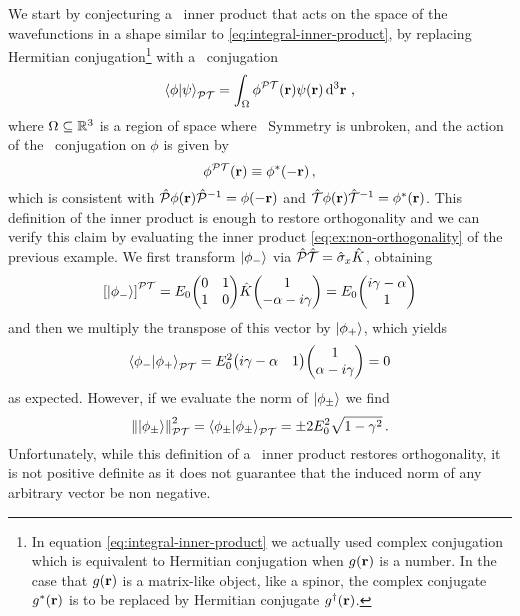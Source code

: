             We start by conjecturing \cite{bender2024} a \PT\ inner product that acts on the space of the wavefunctions in a shape similar to \eqref{eq:integral-inner-product}, by replacing Hermitian conjugation\footnote{In equation \eqref{eq:integral-inner-product} we actually used complex conjugation which is equivalent to Hermitian conjugation when $g\pqty{\vb{r}}$ is a number. In the case that $g\pqty{\vb{r}}$ is a matrix-like object, like a spinor, the complex conjugate $g^*\pqty{\vb{r}}$ is to be replaced by Hermitian conjugate $g^\dag\pqty{\vb{r}}$.} with a \PT\ conjugation
            \begin{equation}
                \label{eq:PT-inner-product-integral}
                \braket{\phi}{\psi}_{\PT} = \int\nolimits_{\Omega} \phi^{\PT}\pqty{\vb{r}} \psi\pqty{\vb{r}} \dd[3]{\vb{r}}
                \mycomma
            \end{equation}
            where $\Omega\subseteq\mathbb{R}^3$ is a region of space where \PT\ Symmetry is unbroken, and the action of the \PT\ conjugation on $\phi$ is given by
            \begin{equation*}
                \phi^{\PT}\pqty{\vb{r}} \equiv \phi^*\pqty{-\vb{r}}
                \mycomma
            \end{equation*}
            which is consistent with $\hP \phi\pqty{\vb{r}} \hP^{-1} = \phi\pqty{{-\vb{r}}}$ and $\hT \phi\pqty{\vb{r}} \hT^{-1} = \phi^*\pqty{{\vb{r}}}$. This definition of the inner product is enough to restore orthogonality and we can verify this claim by evaluating the inner product \eqref{eq:ex:non-orthogonality} of the previous example. We first transform $\ket{\phi_-}$ via $\mathcal{\hat{P}}\mathcal{\hat{T}} = \hat{\sigma}_x \hat{K}$, obtaining
            \begin{equation*}
                \bqty{\ket{\phi_-}}^{\PT}
                = E_0\! \pmqty{\admat[0]{1,1}}\! \hK\! \pmqty{1 \\ -\alpha - i \gamma } = E_0\! \pmqty{i \gamma - \alpha \\ 1}
            \end{equation*}
            and then we multiply the transpose of this vector by $\ket{\phi_+}$, which yields
            \begin{equation*}
                \braket{\phi_-}{\phi_+}_{\PT} = E_0^2 \!\pmqty{i\gamma - \alpha & 1} \!\pmqty{1\\ \alpha - i \gamma} = 0
            \end{equation*}
            as expected. However, if we evaluate the norm of $\ket{\phi_\pm}$ we find
            \begin{equation*}
                \norm{\ket{\phi_\pm}}^2_{\mathcal{P}\mathcal{T}} = \braket{\phi_\pm}{\phi_\pm}_{\mathcal{P}\mathcal{T}} = \pm 2 E_0^2 \sqrt{1 - \gamma^2}
                \,\text{.}
            \end{equation*}
            Unfortunately, while this definition of a \PT\ inner product restores orthogonality, it is not positive definite as it does not guarantee that the induced norm of any arbitrary vector be non negative.

